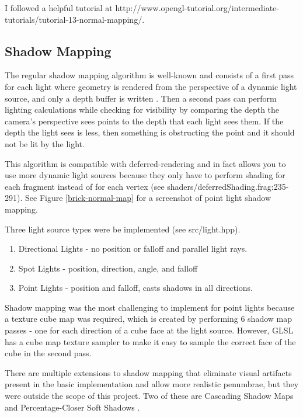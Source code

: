 \documentclass{book}
\begin{document}
      I followed a helpful tutorial at http://www.opengl-tutorial.org/intermediate-tutorials/tutorial-13-normal-mapping/.

    \subsection{Shadow Mapping} \label{shadow-mapping}
      The regular shadow mapping algorithm is well-known and consists of a first pass for each light where geometry is rendered from the perspective of a dynamic light source, and only a depth buffer is written \cite{williams1978casting}. Then a second pass can perform lighting calculations while checking for visibility by comparing the depth the camera's perspective sees points to the depth that each light sees them. If the depth the light sees is less, then something is obstructing the point and it should not be lit by the light.

      This algorithm is compatible with deferred-rendering and in fact allows you to use more dynamic light sources because they only have to perform shading for each fragment instead of for each vertex (see shaders/deferredShading.frag:235-291). See Figure \ref{brick-normal-map} for a screenshot of point light shadow mapping.

      Three light source types were be implemented (see src/light.hpp).
      \begin{enumerate}
        \item Directional Lights - no position or falloff and parallel light rays.
        \item Spot Lights - position, direction, angle, and falloff
        \item Point Lights - position and falloff, casts shadows in all directions.
      \end{enumerate}

      Shadow mapping was the most challenging to implement for point lights because a texture cube map was required, which is created by performing 6 shadow map passes - one for each direction of a cube face at the light source. However, GLSL has a cube map texture sampler to make it easy to sample the correct face of the cube in the second pass.

      There are multiple extensions to shadow mapping that eliminate visual artifacts present in the basic implementation and allow more realistic penumbrae, but they were outside the scope of this project. Two of these are Cascading Shadow Maps and Percentage-Closer Soft Shadows \cite{dimitrov2007cascaded} \cite{fernando2005percentage}.
\end{document}
